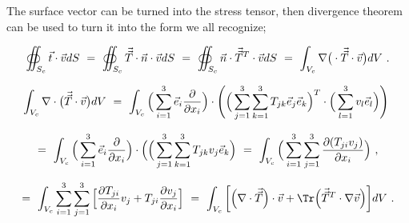 \documentclass{article}
\begin{document}
The surface vector can be turned into the stress tensor, then divergence theorem can be used to 
turn it into the form we all recognize;

\begin{equation} \label{eq:1}
\oiint_{S_c} \vec{t} \cdot \vec{v} dS \hspace{0.125cm} = \hspace{0.125cm} \oiint_{S_c} \vec{\vec{T}} \cdot \vec{n} \cdot \vec{v} dS \hspace{0.125cm} = \hspace{0.125cm} \oiint_{S_c} \vec{n} \cdot \vec{\vec{T}}^T \cdot \vec{v} dS \hspace{0.125cm} = \hspace{0.125cm} \int_{V_c} \nabla \big( \cdot \vec{\vec{T}} \cdot \vec{v} \big) dV \hspace{0.125cm}  . 
\end{equation} 

\begin{equation} \label{eq:1}
\int_{V_c} \nabla  \cdot \big(\vec{\vec{T}} \cdot \vec{v} \big) dV \hspace{0.125cm} = \hspace{0.125cm} \int_{V_c} \Big( \sum_{i = 1}^{3} \vec{e}_i \frac{\partial}{\partial{x_i}} \Big) \cdot \Bigg( \Big( \sum_{j = 1}^{3} \sum_{k = 1}^{3} T_{j k} \vec{e}_j \vec{e}_k \Big)^T \cdot \Big( \sum_{l = 1}^{3} v_l \vec{e}_l \Big) \Bigg) \hspace{0.125cm}   
\end{equation} 

\vspace{-0.5cm}

\begin{equation} \label{eq:1}
= \hspace{0.125cm} \int_{V_c} \Big( \sum_{i = 1}^{3} \vec{e}_i \frac{\partial}{\partial{x_i}} \Big) \cdot \Big( \Big( \sum_{j = 1}^{3} \sum_{k = 1}^{3} T_{j k} v_j \vec{e}_k \Big) \hspace{0.125cm} = \hspace{0.125cm} \int_{V_c} \Big( \sum_{i = 1}^{3} \sum_{j = 1}^{3} \frac{\partial(T_{j i} v_j)}{\partial{x_i}} \Big) \hspace{0.125cm}  , 
\end{equation} 

\begin{equation} \label{eq:1}
= \hspace{0.125cm} \int_{V_c} \sum_{i = 1}^{3} \sum_{j = 1}^{3} \Big[\frac{\partial{T_{j i}}}{\partial{x_i}}  v_j  + T_{j i} \frac{\partial{v_j}}{\partial{x_i}} \Big] \hspace{0.125cm} = \hspace{0.125cm} \int_{V_c} \bigg[ \Big( \nabla \cdot \vec{\vec{T}} \Big) \cdot \vec{v} + \Tr \Big( \vec{\vec{T}}^T \cdot \nabla{\vec{v}} \Big) \bigg] dV \hspace{0.125cm}  .
\end{equation} 
\end{document}
